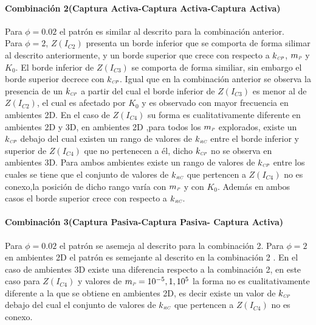 \paragraph*{Combinaci\'on 2(Captura Activa-Captura Activa-Captura Activa)}
Para $\phi  = 0.02$ el patr\'on es similar al descrito para la combinaci\'on anterior. \\
Para $\phi = 2$, $Z(I_{C2})$ presenta un borde inferior que se comporta de forma silimar al descrito anteriormente, y un borde superior que crece con respecto a $k_{\textit{\tiny CP}}$, $m_{\textit{\tiny P}}$ y $K_0$. El borde inferior de $Z(I_{C3})$ se comporta de forma similiar, sin embargo el borde superior decrece con $k_{\textit{\tiny CP}}$. Igual que en la combinaci\'on anterior se observa la presencia de un $k_{\textit{\tiny CP}}$ a partir del cual el borde inferior de $Z(I_{C3})$ es menor al de $Z(I_{C2})$, el cual es afectado por $K_0$ y es observado con mayor frecuencia en ambientes 2D. En el caso de $Z(I_{C4})$ su forma es cualitativamente diferente en ambientes 2D y 3D, en ambientes 2D ,para todos los $m_{\textit{\tiny P}}$ explorados, existe un $k_{\textit{\tiny CP}}$ debajo del cual existen un rango de valores de $k_{\textit{\tiny RC}}$ entre el borde inferior y superior de $Z(I_{C4})$ que no pertenecen a \'el, dicho $k_{\textit{\tiny CP}}$ no se observa en ambientes 3D. Para ambos ambientes existe un rango de valores de $k_{\textit{\tiny CP}}$ entre los cuales se tiene que el conjunto de valores de $k_{\textit{\tiny RC}}$ que pertencen a $Z(I_{C4})$ no es conexo,la posici\'on de dicho rango var\'ia con $m_{\textit{\tiny P}}$ y con $K_0$. Adem\'as en ambos casos el borde superior crece con respecto a $k_{\textit{\tiny RC}}$.

\paragraph*{Combinaci\'on 3(Captura Pasiva-Captura Pasiva- Captura Activa)}
Para $\phi = 0.02$ el patr\'on se asemeja al descrito para la combinaci\'on 2.
Para $\phi = 2$ en ambientes 2D el patr\'on es semejante al descrito en la combinaci\'on 2 . En el caso de ambientes 3D existe una diferencia respecto a la combinaci\'on 2, en este caso para $Z(I_{C4})$ y valores de $m_{\textit{\tiny P}} = 10^{-5},1,10^{5}$ la forma no es cualitativamente diferente a la que se obtiene en ambientes 2D, es decir existe un valor de $k_{\textit{\tiny CP}}$ debajo del cual el conjunto de valores de $k_{\textit{\tiny RC}}$ que pertencen a $Z(I_{C4})$ no es conexo.


